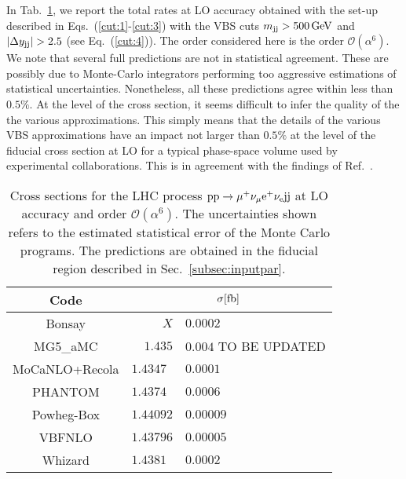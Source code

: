 In Tab.~\ref{tab:wg1_LOrates}, we report the total rates at LO accuracy obtained with the set-up described in Eqs.~(\ref{cut:1}-\ref{cut:3}) with the VBS cuts $m_{\text{j}\text{j}} > 500 \,\text{GeV}$ and $|\Delta y_{\text{j}\text{j}}| > 2.5$ (see Eq.~(\ref{cut:4})).
The order considered here is the order $\mathcal{O}(\alpha^6)$.
We note that several full predictions are not in statistical agreement. These are possibly due to Monte-Carlo 
integrators performing too aggressive estimations of statistical uncertainties. Nonetheless, all these predictions agree within less than $0.5\%$.
At the level of the cross section, it seems difficult to infer the quality of the the various approximations.
This simply means that the details of the various VBS approximations have an impact not larger than $0.5\%$ at 
the level of the fiducial cross section at LO for a typical phase-space volume used by experimental collaborations. This is in agreement with the findings of Ref.~\cite{Oleari:2003tc}.

\begin{table}[h!]
    \centering
    \begin{tabular}{c|r@{ $\pm$ }l}
      Code  &  \multicolumn{2}{c}{$\sigma[\rm{fb}]$}  \\
        \hline
        \hline
        {\sc Bonsay}  &  $X$ & $0.0002$ \\
        {\sc MG5\_aMC}&  $1.435$ & $0.004$ TO BE UPDATED  \\
        {\sc MoCaNLO+Recola}  &  $1.4347\phantom{0}$ & $0.0001$ \\
        {\sc PHANTOM} &  $1.4374\phantom{0}$ & $0.0006 $  \\
        {\sc Powheg-Box}  &  $1.44092$ & $0.00009$ \\
        {\sc VBFNLO}  &  $1.43796$ & $0.00005$ \\
        {\sc Whizard} &  $1.4381\phantom{0}$ & $0.0002 $
    \end{tabular}
    \caption{\label{tab:wg1_LOrates} Cross sections for the LHC process ${\rm p}{\rm p}\to\mu^+\nu_\mu{\rm e}^+\nu_{\rm e}{\rm j}{\rm j}$ at LO accuracy and order $\mathcal{O}(\alpha^6)$.
    The uncertainties shown refers to the estimated statistical error of the Monte Carlo programs.
    The predictions are obtained in the fiducial region described in Sec.~\ref{subsec:inputpar}.
    }
\end{table}
